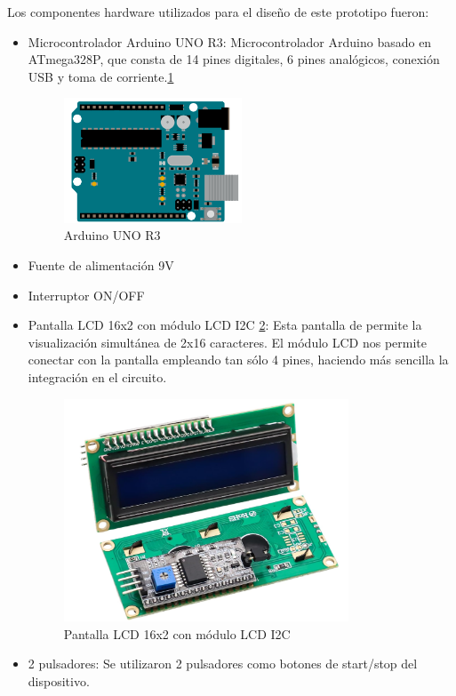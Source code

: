 Los componentes hardware utilizados para el diseño de este prototipo fueron:
\begin{itemize}
\item Microcontrolador Arduino UNO R3: Microcontrolador Arduino basado en ATmega328P, que consta de 14 pines digitales, 6 pines analógicos, conexión USB y toma de corriente.\ref{fig:unor3}
\begin{figure}
    \centering
    \includegraphics[width=0.5\textwidth]{img/unor3.png}
    \caption{Arduino UNO R3}
    \label{fig:unor3}
\end{figure}
\item Fuente de alimentación 9V
\item Interruptor ON/OFF
\item Pantalla LCD 16x2 con módulo LCD I2C \ref{fig:pantalla}: Esta pantalla de permite la visualización simultánea de 2x16 caracteres. El módulo LCD nos permite conectar con la pantalla empleando tan sólo 4 pines, haciendo más sencilla la integración en el circuito. \begin{figure}[h]
    \centering
    \includegraphics[width=0.8\textwidth]{img/pantalla.png}
    \caption{Pantalla LCD 16x2 con módulo LCD I2C \cite{ARCELI_LCD_Module}}
    \label{fig:pantalla}
\end{figure}
\item 2 pulsadores: Se utilizaron 2 pulsadores como botones de start/stop del dispositivo.

\end{itemize}
